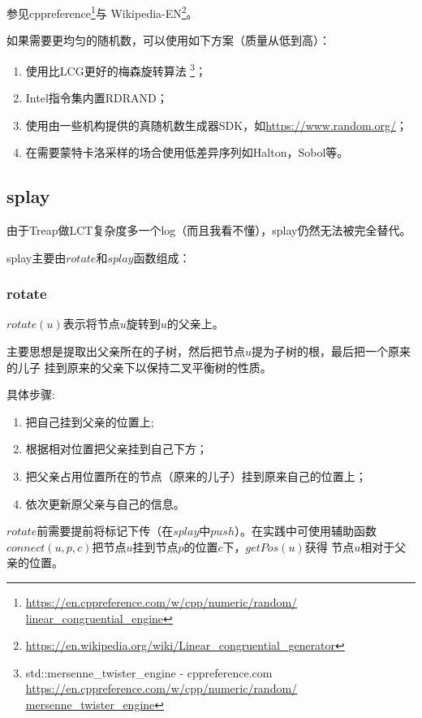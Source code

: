 参见cppreference\footnote{
	\url{https://en.cppreference.com/w/cpp/numeric/random/
		linear\_congruential\_engine}}与
Wikipedia-EN\footnote{
	\url{https://en.wikipedia.org/wiki/Linear\_congruential\_generator}}。

如果需要更均匀的随机数，可以使用如下方案（质量从低到高）：
\begin{enumerate}
	\item 使用比LCG更好的梅森旋转算法
	      \footnote{std::mersenne\_twister\_engine - cppreference.com
		      \url{https://en.cppreference.com/w/cpp/numeric/random/
			      mersenne\_twister\_engine}}；
	\item Intel指令集内置RDRAND；
	\item 使用由一些机构提供的真随机数生成器SDK，如\url{https://www.random.org/}；
	\item 在需要蒙特卡洛采样的场合使用低差异序列如Halton，Sobol等。
\end{enumerate}

\subsection{splay}\label{splay}

由于Treap做LCT复杂度多一个log（而且我看不懂），splay仍然无法被完全替代。

splay主要由$rotate$和$splay$函数组成：

\subsubsection{rotate}

$rotate(u)$表示将节点$u$旋转到$u$的父亲上。

主要思想是提取出父亲所在的子树，然后把节点$u$提为子树的根，最后把一个原来的儿子
挂到原来的父亲下以保持二叉平衡树的性质。

具体步骤:
\begin{enumerate}
	\item 把自己挂到父亲的位置上;
	\item 根据相对位置把父亲挂到自己下方；
	\item 把父亲占用位置所在的节点（原来的儿子）挂到原来自己的位置上；
	\item 依次更新原父亲与自己的信息。
\end{enumerate}

$rotate$前需要提前将标记下传（在$splay$中$push$）。在实践中可使用辅助函数
$connect(u,p,c)$把节点$u$挂到节点$p$的位置$c$下，$getPos(u)$获得
节点$u$相对于父亲的位置。

